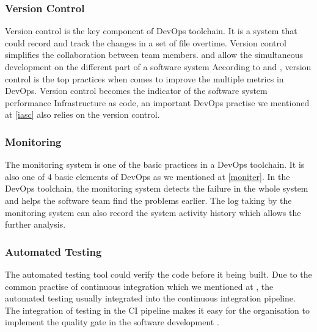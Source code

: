 \subsubsection{Version Control}
Version control is the key component of DevOps toolchain. It is a system that could record and track the changes in a set of file overtime. Version control simplifies the collaboration between team members. and allow the simultaneous development on the different part of a software system According to \cite{Sourcean53:online} and \cite{velasquez2014state}, version control is the top practices when comes to improve the multiple metrics in DevOps. Version control becomes the indicator of the software system performance \cite{Sourcean53:online} Infrastructure as code, an important DevOps practise we mentioned at \ref{iasc} also relies on the version control.
\subsubsection{Monitoring}
The monitoring system is one of the basic practices in a DevOps toolchain\cite{forsgren20192019}. It is also one of 4 basic elements of DevOps as we mentioned at \ref{moniter}. In the DevOps toolchain, the monitoring system detects the failure in the whole system and helps the software team find the problems earlier. The log taking by the monitoring system can also record the system activity history which allows the further analysis.
\subsubsection{Automated Testing}
The automated testing tool could verify the code before it being built. Due to the common practise of continuous integration which we mentioned at \label{CD}, the automated testing usually integrated into the continuous integration pipeline. The integration of testing in the CI pipeline makes it easy for the organisation to implement the quality gate in the software development \cite{huttermann2012devops}.
